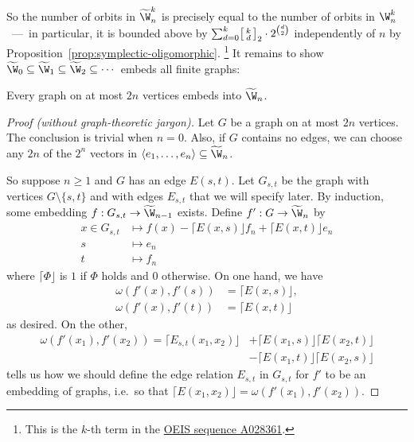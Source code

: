 So the number of orbits in $\widetilde \W_n^k$ is precisely equal to the number of orbits in $\W_n^k$~---~in particular, it is bounded above by $\sum_{d=0}^k \begin{bsmallmatrix}k \\ d\end{bsmallmatrix}_2 \cdot 2^{\binom{d}{2}}$ independently of $n$ by Proposition~\ref{prop:symplectic-oligomorphic}.%
\footnote{This is the $k$-th term in the \href{https://oeis.org/A028361}{OEIS sequence A028361}.}
It remains to show $\widetilde \W_0 \subseteq \widetilde \W_1 \subseteq \widetilde \W_2 \subseteq \cdots$ embeds all finite graphs:

\begin{proposition}[{\cite[Thm.~8.11.2]{GR01}}]
    Every graph on at most $2n$ vertices embeds into $\widetilde \W_n$.
\end{proposition}
\begin{proof}[Proof (without graph-theoretic jargon)]

    Let $G$ be a graph on at most $2n$ vertices. 
    The conclusion is trivial when $n = 0$.
    Also, if $G$ contains no edges, we can choose any $2n$ of the $2^n$ vectors in 
    $\langle e_1, \ldots, e_n \rangle \subseteq \widetilde \W_n$.
    
    So suppose $n \geq 1$ and $G$ has an edge $E(s, t)$.
    Let $G_{s,t}$ be the graph with vertices $G \setminus \{s, t\}$ and with edges $E_{s,t}$ that we will specify later.
    By induction, some embedding $f : G_{s, t} \to \widetilde \W_{n-1}$ exists.
    Define $f' : G \to \widetilde \W_n$ by
    \begin{align*}
        x \in G_{s, t} &\mapsto f(x) - \lceil E(x, s) \rfloor  f_n + \lceil E(x, t) \rfloor  e_n \\
        s &\mapsto e_n \\
        t &\mapsto f_n
    \end{align*}
    where $\lceil \Phi \rfloor $ is $1$ if $\Phi$ holds and $0$ otherwise.
    On one hand, we have
    \begin{align*}
        \omega(f'(x), f'(s)) &= \lceil E(x, s) \rfloor , \\
        \omega(f'(x), f'(t)) &= \lceil E(x, t) \rfloor 
    \end{align*}
    as desired.
    On the other,
    \begin{align*}
        \omega( f'(x_1), f'(x_2) ) 
        = \lceil E_{s,t}(x_1, x_2) \rfloor  
        &+ \lceil E(x_1, s) \rfloor  \lceil E(x_2, t) \rfloor  \\
        &- \lceil E(x_1, t) \rfloor  \lceil E(x_2, s) \rfloor 
    \end{align*}
    tells us how we should define the edge relation $E_{s,t}$ in $G_{s,t}$ for $f'$ to be an embedding of graphs, 
    i.e.~so that $\lceil E(x_1, x_2) \rfloor  = \omega( f'(x_1), f'(x_2) )$.
\end{proof}

